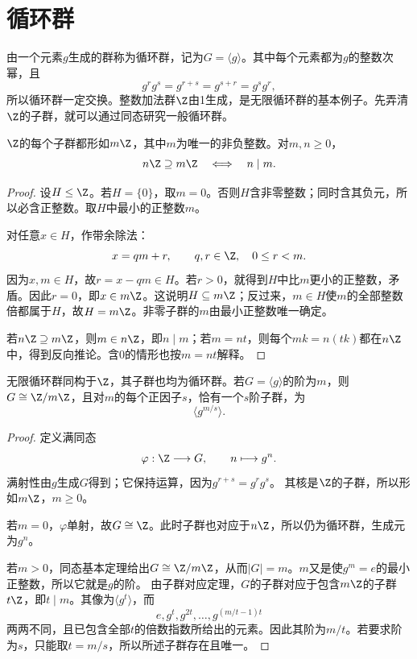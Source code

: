 \section{循环群}

由一个元素$g$生成的群称为循环群，记为$G=\langle g\rangle$。其中每个元素都为$g$的整数次幂，且
\[
g^rg^s=g^{r+s}=g^{s+r}=g^sg^r,
\]
所以循环群一定交换。整数加法群$\Z$由1生成，是无限循环群的基本例子。先弄清$\Z$的子群，就可以通过同态研究一般循环群。

\begin{proposition}
$\Z$的每个子群都形如$m\Z$，其中$m$为唯一的非负整数。对$m,n\geq0$，
\[
n\Z\supseteq m\Z\quad\Longleftrightarrow\quad n\mid m.
\]
\end{proposition}
\begin{proof}
设$H\leq\Z$。若$H=\{0\}$，取$m=0$。否则$H$含非零整数；同时含其负元，所以必含正整数。取$H$中最小的正整数$m$。

对任意$x\in H$，作带余除法：
\[
x=qm+r,\qquad q,r\in\Z,\quad0\leq r<m.
\]
因为$x,m\in H$，故$r=x-qm\in H$。若$r>0$，就得到$H$中比$m$更小的正整数，矛盾。因此$r=0$，即$x\in m\Z$。这说明$H\subseteq m\Z$；反过来，$m\in H$使$m$的全部整数倍都属于$H$，故$H=m\Z$。非零子群的$m$由最小正整数唯一确定。

若$n\Z\supseteq m\Z$，则$m\in n\Z$，即$n\mid m$；若$m=nt$，则每个$mk=n(tk)$都在$n\Z$中，得到反向推论。含0的情形也按$m=nt$解释。
\end{proof}

\begin{theorem}
无限循环群同构于$\Z$，其子群也均为循环群。若$G=\langle g\rangle$的阶为$m$，则$G\cong\Z/m\Z$，且对$m$的每个正因子$s$，恰有一个$s$阶子群，为
\[
\langle g^{m/s}\rangle.
\]
\end{theorem}
\begin{proof}
定义满同态
\[
\varphi:\Z\longrightarrow G,\qquad n\longmapsto g^n.
\]
满射性由$g$生成$G$得到；它保持运算，因为$g^{r+s}=g^rg^s$。
其核是$\Z$的子群，所以形如$m\Z$，$m\geq0$。

若$m=0$，$\varphi$单射，故$G\cong\Z$。此时子群也对应于$n\Z$，所以仍为循环群，生成元为$g^n$。

若$m>0$，同态基本定理给出$G\cong\Z/m\Z$，从而$|G|=m$。$m$又是使$g^m=e$的最小正整数，所以它就是$g$的阶。
由子群对应定理，$G$的子群对应于包含$m\Z$的子群$t\Z$，即$t\mid m$。其像为$\langle g^t\rangle$，而
\[
e,g^t,g^{2t},\ldots,g^{(m/t-1)t}
\]
两两不同，且已包含全部$t$的倍数指数所给出的元素。因此其阶为$m/t$。若要求阶为$s$，只能取$t=m/s$，所以所述子群存在且唯一。
\end{proof}

